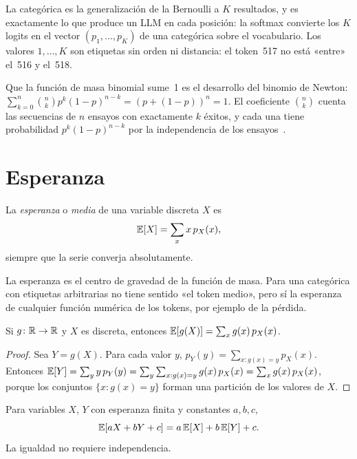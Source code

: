 La categórica es la generalización de la Bernoulli a $K$ resultados, y es exactamente lo que produce un LLM en cada posición: la softmax convierte los $K$ logits en el vector $(p_1,\dots,p_K)$ de una categórica sobre el vocabulario. Los valores $1,\dots,K$ son etiquetas sin orden ni distancia: el token~517 no está «entre» el~516 y el~518.

\begin{ejemplo}
Que la función de masa binomial sume~1 es el desarrollo del binomio de Newton: $\sum_{k=0}^{n}\binom nk p^{k}(1-p)^{n-k}=(p+(1-p))^{n}=1$. El coeficiente $\binom nk$ cuenta las secuencias de $n$ ensayos con exactamente $k$ éxitos, y cada una tiene probabilidad $p^{k}(1-p)^{n-k}$ por la independencia de los ensayos~\cite[§2.2]{bt}.
\end{ejemplo}

\section{Esperanza}

\begin{definicion}[Esperanza]\label{def:esperanza}
La \emph{esperanza} o \emph{media} de una variable discreta $X$ es
\[
\mathbb{E}[X]=\sum_x x\,p_X(x),
\]
siempre que la serie converja absolutamente.
\end{definicion}

La esperanza es el centro de gravedad de la función de masa. Para una categórica con etiquetas arbitrarias no tiene sentido «el token medio», pero sí la esperanza de cualquier función numérica de los tokens, por ejemplo de la pérdida.

\begin{teorema}\label{teo:lotus}
Si $g\colon\mathbb{R}\to\mathbb{R}$ y $X$ es discreta, entonces $\mathbb{E}[g(X)]=\sum_x g(x)\,p_X(x)$.
\end{teorema}

\begin{proof}
Sea $Y=g(X)$. Para cada valor $y$, $p_Y(y)=\sum_{x:g(x)=y}p_X(x)$. Entonces $\mathbb{E}[Y]=\sum_y y\,p_Y(y)=\sum_y\sum_{x:g(x)=y}g(x)\,p_X(x)=\sum_x g(x)\,p_X(x)$, porque los conjuntos $\{x:g(x)=y\}$ forman una partición de los valores de $X$.
\end{proof}

\begin{proposicion}[Linealidad]\label{prop:linealidad}
Para variables $X$, $Y$ con esperanza finita y constantes $a,b,c$,
\[
\mathbb{E}[aX+bY+c]=a\,\mathbb{E}[X]+b\,\mathbb{E}[Y]+c.
\]
La igualdad no requiere independencia.
\end{proposicion}

